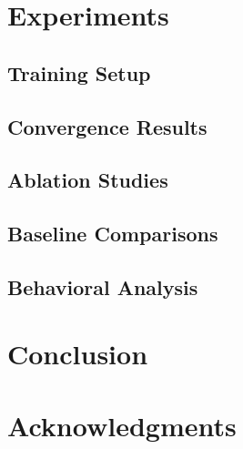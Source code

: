 \documentclass[letterpaper, 10 pt, conference]{ieeeconf}
\begin{document}
\section{Experiments}
\label{sec:experiments}

\subsection{Training Setup}

\subsection{Convergence Results}

\subsection{Ablation Studies}

\subsection{Baseline Comparisons}

\subsection{Behavioral Analysis}

\section{Conclusion}
\label{sec:conclusion}

\section*{Acknowledgments}



\end{document}
